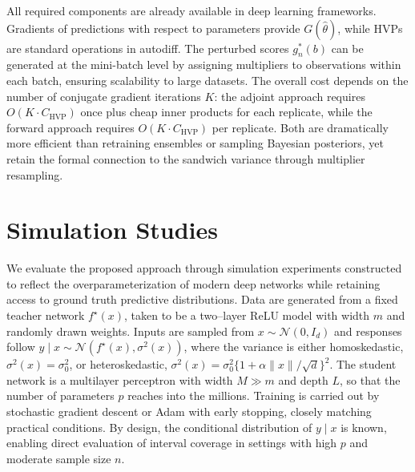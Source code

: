 \documentclass[12pt, titlepage, reqno]{article}
\begin{document}
All required components are already available in deep learning
frameworks. Gradients of predictions with respect to parameters provide
$G(\hat{\theta})$, while HVPs are standard operations in autodiff. The
perturbed scores $g_n^*(b)$ can be generated at the mini-batch level by
assigning multipliers to observations within each batch, ensuring
scalability to large datasets. The overall cost depends on the number of
conjugate gradient iterations $K$: the adjoint approach requires
$O(K\cdot C_{\text{HVP}})$ once plus cheap inner products for each
replicate, while the forward approach requires $O(K\cdot C_{\text{HVP}})$
per replicate. Both are dramatically more efficient than retraining
ensembles or sampling Bayesian posteriors, yet retain the formal
connection to the sandwich variance through multiplier resampling.

\section{Simulation Studies}

We evaluate the proposed approach through simulation experiments
constructed to reflect the overparameterization of modern deep
networks while retaining access to ground truth predictive
distributions. Data are generated from a fixed teacher network
$f^\star(x)$, taken to be a two–layer ReLU model with width $m$ and
randomly drawn weights. Inputs are sampled from
$x\sim\mathcal{N}(0,I_d)$ and responses follow
$y\mid x \sim \mathcal{N}(f^\star(x),\sigma^2(x))$, where the variance
is either homoskedastic, $\sigma^2(x)=\sigma_0^2$, or heteroskedastic,
$\sigma^2(x)=\sigma_0^2\{1+\alpha \|x\|/\sqrt{d}\}^2$. The student
network is a multilayer perceptron with width $M\gg m$ and depth $L$,
so that the number of parameters $p$ reaches into the millions.
Training is carried out by stochastic gradient descent or Adam with
early stopping, closely matching practical conditions. By design, the
conditional distribution of $y\mid x$ is known, enabling direct
evaluation of interval coverage in settings with high $p$ and moderate
sample size $n$.
\end{document}
